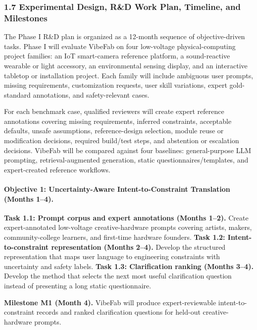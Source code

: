 \subsubsection*{1.7 Experimental Design, R\&D Work Plan, Timeline, and Milestones}

The Phase I R\&D plan is organized as a 12-month sequence of objective-driven tasks. Phase I will evaluate VibeFab on four low-voltage physical-computing project families: an IoT smart-camera reference platform, a sound-reactive wearable or light accessory, an environmental sensing display, and an interactive tabletop or installation project. Each family will include ambiguous user prompts, missing requirements, customization requests, user skill variations, expert gold-standard annotations, and safety-relevant cases.

For each benchmark case, qualified reviewers will create expert reference annotations covering missing requirements, inferred constraints, acceptable defaults, unsafe assumptions, reference-design selection, module reuse or modification decisions, required build/test steps, and abstention or escalation decisions. VibeFab will be compared against four baselines: general-purpose LLM prompting, retrieval-augmented generation, static questionnaires/templates, and expert-created reference workflows.

\vspace{-10pt}
\paragraph{Objective 1: Uncertainty-Aware Intent-to-Constraint Translation (Months 1--4).}
\textbf{Task 1.1: Prompt corpus and expert annotations (Months 1--2).}
Create expert-annotated low-voltage creative-hardware prompts covering artists, makers, community-college learners, and first-time hardware founders.
\textbf{Task 1.2: Intent-to-constraint representation (Months 2--4).}
Develop the structured representation that maps user language to engineering constraints with uncertainty and safety labels.
\textbf{Task 1.3: Clarification ranking (Months 3--4).}
Develop the method that selects the next most useful clarification question instead of presenting a long static questionnaire.

\textbf{Milestone M1 (Month 4).}
VibeFab will produce expert-reviewable intent-to-constraint records and ranked clarification questions for held-out creative-hardware prompts.

